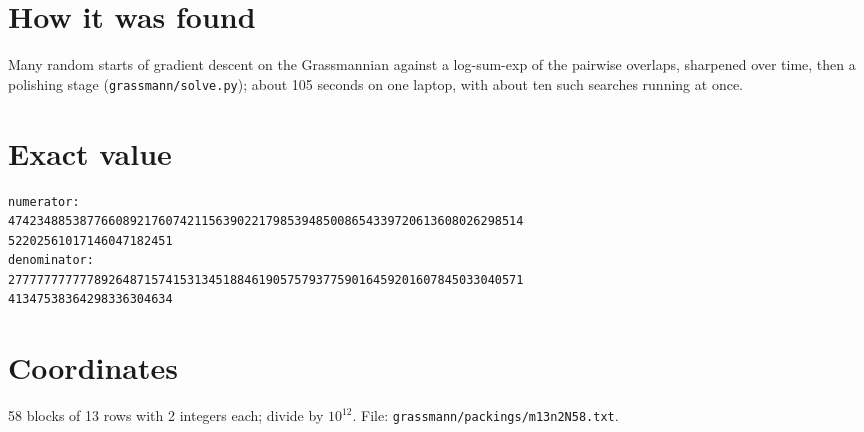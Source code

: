 \documentclass[11pt,a4paper]{article}
\begin{document}
\section{How it was found}
Many random starts of gradient descent on the Grassmannian against a log-sum-exp of the pairwise overlaps, sharpened over time, then a polishing stage (\texttt{grassmann/solve.py}); about 105 seconds on one laptop, with about ten such searches running at once.


\appendix
\section{Exact value}
{\small
\begin{verbatim}
numerator:
474234885387766089217607421156390221798539485008654339720613608026298514
52202561017146047182451
denominator:
277777777777892648715741531345188461905757937759016459201607845033040571
41347538364298336304634
\end{verbatim}}

\section{Coordinates}
58 blocks of 13 rows with 2 integers each; divide by $10^{12}$. File: \texttt{grassmann/packings/m13n2N58.txt}.
{\tiny
\begin{multicols}{4}
\end{multicols}}
\end{document}
